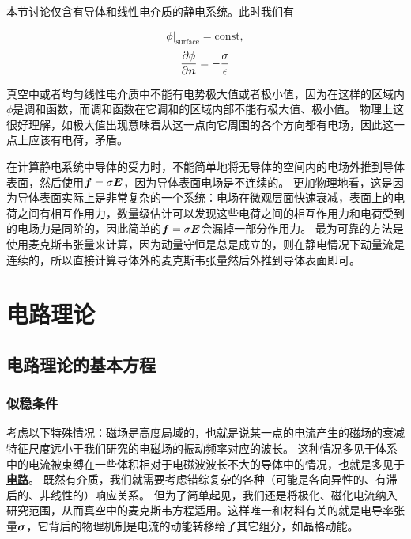 \documentclass[UTF8, a4paper]{ctexart}
\newcommand*{\const}{\mathrm{const}}
\newcommand*{\concept}[1]{\underline{\textbf{#1}}}
\begin{document}
本节讨论仅含有导体和线性电介质的静电系统。此时我们有

\begin{equation}
    \phi|_\text{surface} = \const,
\end{equation}
\begin{equation}
    \pdv{\phi}{\vb*{n}} = - \frac{\sigma}{\epsilon}
\end{equation}

真空中或者均匀线性电介质中不能有电势极大值或者极小值，因为在这样的区域内$\phi$是调和函数，而调和函数在它调和的区域内部不能有极大值、极小值。
物理上这很好理解，如极大值出现意味着从这一点向它周围的各个方向都有电场，因此这一点上应该有电荷，矛盾。

在计算静电系统中导体的受力时，不能简单地将无导体的空间内的电场外推到导体表面，然后使用$\vb*{f}=\sigma\vb*{E}$，因为导体表面电场是不连续的。
更加物理地看，这是因为导体表面实际上是非常复杂的一个系统：电场在微观层面快速衰减，表面上的电荷之间有相互作用力，数量级估计可以发现这些电荷之间的相互作用力和电荷受到的电场力是同阶的，因此简单的$\vb*{f}=\sigma\vb*{E}$会漏掉一部分作用力。
最为可靠的方法是使用麦克斯韦张量来计算，因为动量守恒是总是成立的，则在静电情况下动量流是连续的，所以直接计算导体外的麦克斯韦张量然后外推到导体表面即可。

\section{电路理论}

\subsection{电路理论的基本方程}

\subsubsection{似稳条件}

考虑以下特殊情况：磁场是高度局域的，也就是说某一点的电流产生的磁场的衰减特征尺度远小于我们研究的电磁场的振动频率对应的波长。
这种情况多见于体系中的电流被束缚在一些体积相对于电磁波波长不大的导体中的情况，也就是多见于\concept{电路}。
既然有介质，我们就需要考虑错综复杂的各种（可能是各向异性的、有滞后的、非线性的）响应关系。
但为了简单起见，我们还是将极化、磁化电流纳入研究范围，从而真空中的麦克斯韦方程适用。这样唯一和材料有关的就是电导率张量$\vb*{\sigma}$，它背后的物理机制是电流的动能转移给了其它组分，如晶格动能。
\end{document}
